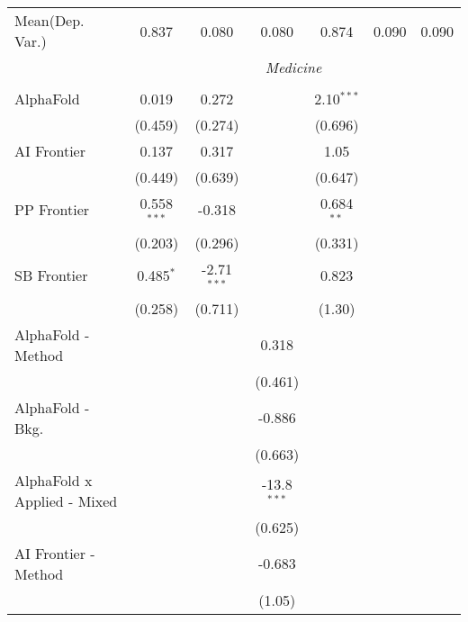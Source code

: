 \begin{tabular}{lcccccc}
Mean(Dep. Var.) & 0.837 & 0.080 & 0.080 & 0.874 & 0.090 & 0.090 \\
 & \multicolumn{6}{c}{\textit{Medicine}} \\ \\
   AlphaFold                     & 0.019         & 0.272         &               & 2.10$^{***}$ &        &   \\   
                                 & (0.459)       & (0.274)       &               & (0.696)      &        &   \\   
   AI Frontier                   & 0.137         & 0.317         &               & 1.05         &        &   \\   
                                 & (0.449)       & (0.639)       &               & (0.647)      &        &   \\   
   PP Frontier                   & 0.558$^{***}$ & -0.318        &               & 0.684$^{**}$ &        &   \\   
                                 & (0.203)       & (0.296)       &               & (0.331)      &        &   \\   
   SB Frontier                   & 0.485$^{*}$   & -2.71$^{***}$ &               & 0.823        &        &   \\   
                                 & (0.258)       & (0.711)       &               & (1.30)       &        &   \\   
   AlphaFold - Method            &               &               & 0.318         &              &        &   \\   
                                 &               &               & (0.461)       &              &        &   \\   
   AlphaFold - Bkg.              &               &               & -0.886        &              &        &   \\   
                                 &               &               & (0.663)       &              &        &   \\   
   AlphaFold x Applied - Mixed   &               &               & -13.8$^{***}$ &              &        &   \\   
                                 &               &               & (0.625)       &              &        &   \\   
   AI Frontier - Method          &               &               & -0.683        &              &        &   \\   
                                 &               &               & (1.05)        &              &        &   \\   

\end{tabular}
